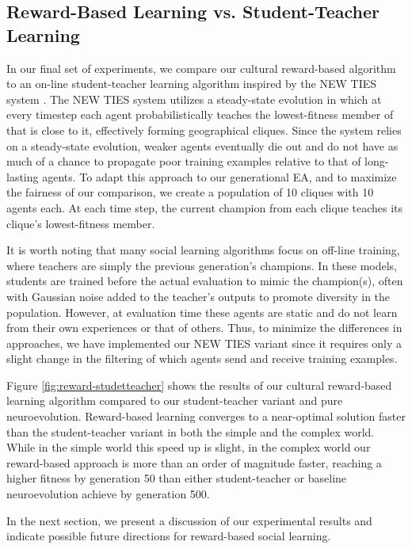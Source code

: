 \documentclass{acm_proc_article-sp}
\begin{document}
\subsection*{Reward-Based Learning vs. Student-Teacher Learning}
In our final set of experiments, we compare our cultural reward-based algorithm to an on-line student-teacher learning algorithm inspired by the NEW TIES system \cite{haasdijk2008social}. The NEW TIES system utilizes a steady-state evolution in which at every timestep each agent probabilistically teaches the lowest-fitness member of that is close to it, effectively forming geographical cliques. Since the system relies on a steady-state evolution, weaker agents eventually die out and do not have as much of a chance to propagate poor training examples relative to that of long-lasting agents. To adapt this approach to our generational EA, and to maximize the fairness of our comparison, we create a population of 10 cliques with 10 agents each. At each time step, the current champion from each clique teaches its clique's lowest-fitness member.

It is worth noting that many social learning algorithms focus on off-line training, where teachers are simply the previous generation's champions. In these models, students are trained before the actual evaluation to mimic the champion(s), often with Gaussian noise added to the teacher's outputs to promote diversity in the population. However, at evaluation time these agents are static and do not learn from their own experiences or that of others. Thus, to minimize the differences in approaches, we have implemented our NEW TIES variant since it requires only a slight change in the filtering of which agents send and receive training examples.

Figure \ref{fig:reward-studetteacher} shows the results of our cultural reward-based learning algorithm compared to our student-teacher variant and pure neuroevolution. Reward-based learning converges to a near-optimal solution faster than the student-teacher variant in both the simple and the complex world. While in the simple world this speed up is slight, in the complex world our reward-based approach is more than an order of magnitude faster, reaching a higher fitness by generation 50 than either student-teacher or baseline neuroevolution achieve by generation 500.

In the next section, we present a discussion of our experimental results and indicate possible future directions for reward-based social learning.
\end{document}
